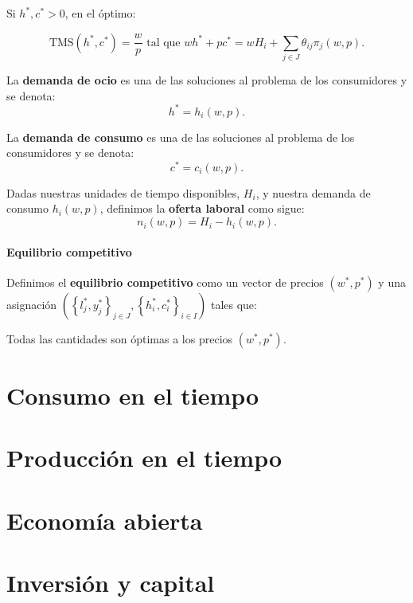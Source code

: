 \documentclass[8pt,a4paper]{extarticle}
\begin{document}
\begin{multicols}{3}
Si $h^*, c^* > 0$, en el óptimo:

\[ \text{TMS} (h^*, c^*) = \frac{w}{p} \text{ tal que } wh^* + pc^* = wH_i + \sum_{j \in J} \theta_{ij} \pi_j(w, p) .\]

\begin{boxdef}
	La \textbf{demanda de ocio} es una de las soluciones al problema de los consumidores y se denota:
	\[
		h^* = h_i(w, p)
	.\] 
\end{boxdef}

\begin{boxdef}
	La \textbf{demanda de consumo} es una de las soluciones al problema de los consumidores y se denota:
	\[
		c^* = c_i(w, p)
	.\] 
\end{boxdef}

\begin{boxdef}
	Dadas nuestras unidades de tiempo disponibles, $H_i$, y nuestra demanda de consumo $h_i(w, p)$, definimos la \textbf{oferta laboral} como sigue:
	\[
		n_i(w, p) = H_i - h_i(w, p)
	.\] 
\end{boxdef}

\newpage

\subsection{Equilibrio competitivo}

\begin{boxdef}
	Definimos el \textbf{equilibrio competitivo} como un vector de precios $(w^*, p^*)$ y una asignación $\left( \left\{ l^*_j, y^*_j \right\}_{j \in J}, \left\{ h^*_i, c^*_i \right\}_{i \in I} \right)$ tales que:
	\begin{eqlist}
	\item Todas las cantidades son óptimas a los precios $(w^*, p^*)$.
	\end{eqlist}
\end{boxdef}

\newpage

\part{Consumo en el tiempo}

\newpage

\part{Producción en el tiempo}

\newpage

\part{Economía abierta}

\newpage

\part{Inversión y capital}

\vfill\eject
\columnbreak
\end{multicols}
\end{document}
